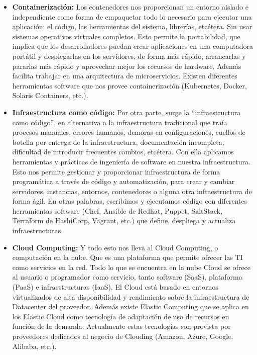 \begin{itemize}
\item \textbf{Containerización:} Los contenedores nos proporcionan un entorno aislado e independiente como forma de empaquetar todo lo necesario para ejecutar una aplicación: el código, las herramientas del sistema, librerías, etcétera. Sin usar sistemas operativos virtuales completos. Esto permite la portabilidad, que implica que los desarrolladores puedan crear aplicaciones en una computadora portátil y desplegarlas en los servidores, de forma más rápido, arrancarlas y pararlas más rápido y aprovechar mejor los recursos de hardware. Además facilita trabajar en una arquitectura de microservicios. Existen diferentes herramientas software que nos provee containerización (Kubernetes, Docker, Solaris Containers, etc.).

\item \textbf{Infraestructura como código:} Por otra parte, surge la “infraestructura como código”, en alternativa a la infraestructura tradicional que traía procesos manuales, errores humanos, demoras en configuraciones, cuellos de botella por entrega de la infraestructura, documentación incompleta, dificultad de introducir frecuentes cambios, etcétera. Con ella aplicamos herramientas y prácticas de ingeniería de software en nuestra infraestructura. Esto nos permite gestionar y proporcionar infraestructura de forma programática a través de código y automatización, para crear y cambiar servidores, instancias, entornos, contenedores o alguna otra infraestructura de forma ágil. En otras palabras, escribimos y ejecutamos código con diferentes herramientas software (Chef, Ansible de Redhat, Puppet, SaltStack, Terraform de HashiCorp, Vagrant, etc.) que define, despliega y actualiza infraestructuras.

\item \textbf{Cloud Computing:} Y todo esto nos lleva al Cloud Computing, o computación en la nube. Que es una plataforma que permite ofrecer las TI como servicios en la red. Todo lo que se encuentra en la nube Cloud se ofrece al usuario o programador como servicio, tanto software (SaaS), plataforma (PaaS) e infraestructuras (IaaS). El Cloud está basado en entornos virtualizados de alta disponibilidad y rendimiento sobre la infraestructura de Datacenter del proveedor. Además existe Elastic Computing que se aplica en los Elastic Cloud como tecnología de adaptación de uso de recursos en función de la demanda. Actualmente estas tecnologías son provista por proveedores dedicados al negocio de Clouding (Amazon, Azure, Google, Alibaba, etc.).

\end{itemize}


